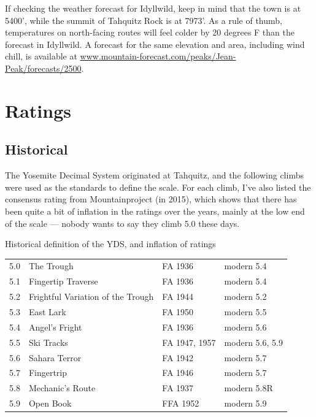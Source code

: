\documentclass{tahquitz}
\begin{document}
If checking the weather forecast for Idyllwild, keep in mind that the town is at 5400',
while the summit of Tahquitz Rock is at 7973'. As a rule of thumb, temperatures on north-facing
routes will feel colder by 20 degrees F than the forecast in Idyllwild.
A forecast for the same elevation and area, including wind chill, is
available at \url{www.mountain-forecast.com/peaks/Jean-Peak/forecasts/2500}.

\section{Ratings}

\subsection{Historical}

The Yosemite Decimal System originated at Tahquitz, and the following
climbs were used as the standards to define the scale. For each climb, I've also listed the
consensus rating from Mountainproject (in 2015), which shows that there has been
quite a bit of inflation in the ratings over the years, mainly at the low end of the
scale --- nobody wants to say they climb 5.0 these days.

\begin{mytable}{Historical definition of the YDS, and inflation of ratings}
\begin{tabular}{llll}
5.0 & The Trough                        & FA 1936 & modern  5.4 \\
5.1 & Fingertip Traverse                & FA 1936 & modern  5.4 \\
5.2 & Frightful Variation of the Trough & FA 1944 & modern  5.2 \\
5.3 & East Lark                         & FA 1950 & modern  5.5 \\
5.4 & Angel's Fright                    & FA 1936 & modern  5.6 \\
5.5 & Ski Tracks                        & FA 1947, 1957 & modern  5.6, 5.9 \\
5.6 & Sahara Terror                     & FA 1942 & modern  5.7 \\
5.7 & Fingertrip                        & FA 1946 & modern  5.7 \\
5.8 & Mechanic's Route                  & FA 1937 & modern  5.8R \\
5.9 & Open Book                         & FFA 1952 & modern  5.9
\end{tabular}
\end{mytable}
\end{document}
